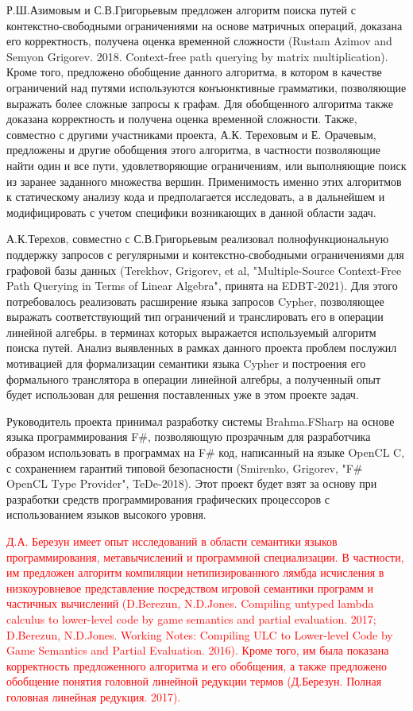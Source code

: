 \documentclass[12pt]{article}  %
\theoremstyle{remark}
\newcommand{\checkme}[1]{\textcolor{red}{#1}}
\begin{document}
Р.Ш.Азимовым и С.В.Григорьевым предложен алгоритм поиска путей с контекстно-свободными ограничениями на основе матричных операций, доказана его корректность, получена оценка временной сложности (Rustam Azimov and Semyon Grigorev. 2018. Context-free path querying by matrix multiplication). Кроме того, предложено обобщение данного алгоритма, в котором в качестве ограничений над путями используются конъюнктивные грамматики, позволяющие выражать более сложные запросы к графам. Для обобщенного алгоритма также доказана корректность и получена оценка временной сложности. Также, совместно с другими участниками проекта, А.К. Тереховым и Е. Орачевым, предложены и другие обобщения этого алгоритма, в частности позволяющие найти один и все пути, удовлетворяющие ограничениям, или выполняющие поиск из заранее заданного множества вершин. Применимость именно этих алгоритмов к статическому анализу кода и предполагается исследовать, а в дальнейшем и модифицировать с учетом специфики возникающих в данной области задач.

А.К.Терехов, совместно с С.В.Григорьевым реализовал полнофункциональную поддержку запросов с регулярными и контекстно-свободными ограничениями для графовой базы данных (Terekhov, Grigorev, et al, "Multiple-Source Context-Free Path Querying in Terms of Linear Algebra", принята на EDBT-2021). Для этого потребовалось реализовать расширение языка запросов Cypher, позволяющее выражать соответствующий тип ограничений и транслировать его в операции линейной алгебры. в терминах которых выражается используемый алгоритм поиска путей. Анализ выявленных в рамках данного проекта проблем послужил мотивацией для формализации семантики языка Cypher и построения его формального транслятора в операции линейной алгебры, а полученный опыт будет использован для решения поставленных уже в этом проекте задач. 

Руководитель проекта принимал разработку системы Brahma.FSharp на основе языка программирования F\#, позволяющую прозрачным для разработчика образом использовать в программах на F\# код, написанный на языке OpenCL C, с сохранением гарантий типовой безопасности (Smirenko, Grigorev, "F\# OpenCL Type Provider", TeDe-2018). Этот проект будет взят за основу при разработки средств программирования графических процессоров с использованием языков высокого уровня. 

\checkme{Д.А. Березун имеет опыт исследований в области семантики языков программирования, метавычислений и программной специализации. В частности, им предложен алгоритм компиляции нетипизированного лямбда исчисления в низкоуровневое представление посредством игровой семантики программ и частичных вычислений (D.Berezun, N.D.Jones. Compiling untyped lambda calculus to lower-level code by game semantics and partial evaluation. 2017; D.Berezun, N.D.Jones. Working Notes: Compiling ULC to Lower-level Code by Game Semantics and Partial Evaluation. 2016). Кроме того, им была показана корректность предложенного алгоритма и его обобщения, а также предложено обобщение понятия головной линейной редукции термов (Д.Березун. Полная головная линейная редукция. 2017).}
\end{document}
